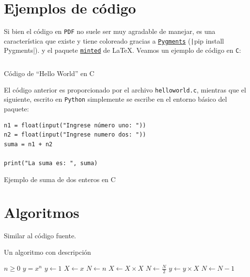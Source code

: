 \section{Ejemplos de código}

Si bien el código en \texttt{PDF} no suele ser muy agradable de manejar, es una característica que existe y tiene coloreado gracias a \href{https://pypi.org/project/Pygments/}{\texttt{Pygments}} (\texttt|pip install Pygments|). y el paquete \href{https://ctan.org/pkg/minted}{\texttt{minted}} de \LaTeX{}. Veamos un ejemplo de código en \texttt{C}:

\begin{listing}[H]
    \centering
    \inputminted[frame=single]{c}{src/code/helloworld.c}
    \label{lst:the-code}
    \caption{Código de ``Hello World'' en C}
\end{listing}

El código anterior es proporcionado por el archivo \texttt{helloworld.c}, mientras que el siguiente, escrito en \texttt{Python} simplemente se escribe en el entorno básico del paquete:

\begin{listing}[H]
\begin{verbatim}
n1 = float(input("Ingrese número uno: "))
n2 = float(input("Ingrese numero dos: "))
suma = n1 + n2

print("La suma es: ", suma)
\end{verbatim}
\label{}
\caption{Ejemplo de suma de dos enteros en C}
\end{listing}

\newpage

\section{Algoritmos}

Similar al código fuente.

\begin{algorithm}[H]
\caption{Un algoritmo con descripción}\label{alg:cap}
\begin{algorithmic}
\Require $n \geq 0$
\Ensure $y = x^n$
\State $y \gets 1$
\State $X \gets x$
\State $N \gets n$
    \State $X \gets X \times X$
    \State $N \gets \frac{N}{2}$  
    \State $y \gets y \times X$
    \State $N \gets N - 1$
\EndIf
\EndWhile
\end{algorithmic}
\end{algorithm}
